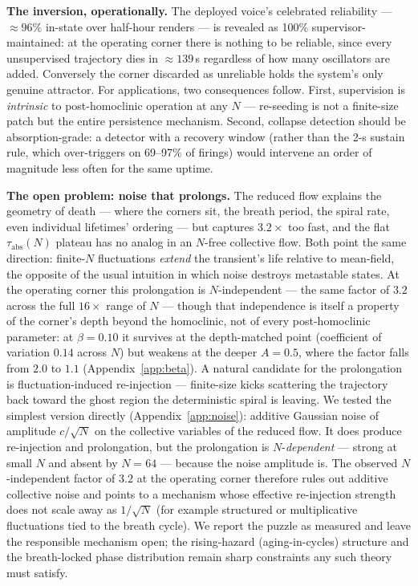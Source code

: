 \documentclass[11pt]{article}
\begin{document}
\textbf{The inversion, operationally.} The deployed voice's celebrated reliability
--- $\approx 96\%$ in-state over half-hour renders --- is revealed as 100\%
supervisor-maintained: at the operating corner there is nothing to be reliable,
since every unsupervised trajectory dies in $\approx 139$\,s regardless of how many
oscillators are added. Conversely the corner discarded as unreliable holds the
system's only genuine attractor. For applications, two consequences follow. First,
supervision is \emph{intrinsic} to post-homoclinic operation at any $N$ ---
re-seeding is not a finite-size patch but the entire persistence mechanism. Second,
collapse detection should be absorption-grade: a detector with a recovery window
(rather than the 2-s sustain rule, which over-triggers on 69--97\% of firings)
would intervene an order of magnitude less often for the same uptime.

\textbf{The open problem: noise that prolongs.} The reduced flow explains the
geometry of death --- where the corners sit, the breath period, the spiral rate,
even individual lifetimes' ordering --- but captures $3.2\times$ too fast, and the
flat $\tau_{\mathrm{abs}}(N)$ plateau has no analog in an $N$-free collective flow.
Both point the same direction: finite-$N$ fluctuations \emph{extend} the transient's
life relative to mean-field, the opposite of the usual intuition in which noise
destroys metastable states. At the operating corner this prolongation is $N$-independent --- the same factor of
$3.2$ across the full $16\times$ range of $N$ --- though that independence is itself
a property of the corner's depth beyond the homoclinic, not of every post-homoclinic
parameter: at $\beta = 0.10$ it survives at the depth-matched point (coefficient of
variation $0.14$ across $N$) but weakens at the deeper $A = 0.5$, where the factor
falls from $2.0$ to $1.1$ (Appendix~\ref{app:beta}). A natural candidate for the
prolongation is fluctuation-induced re-injection --- finite-size kicks scattering the
trajectory back toward the ghost region the deterministic spiral is leaving. We
tested the simplest version directly (Appendix~\ref{app:noise}): additive Gaussian
noise of amplitude $c/\sqrt N$ on the collective variables of the reduced flow. It
does produce re-injection and prolongation, but the prolongation is
$N$-\emph{dependent} --- strong at small $N$ and absent by $N = 64$ --- because the
noise amplitude is. The observed $N$-independent factor of $3.2$ at the operating
corner therefore rules out additive collective noise and points to a mechanism whose
effective re-injection strength does not scale away as $1/\sqrt N$ (for example
structured or multiplicative fluctuations tied to the breath cycle). We report the
puzzle as measured and leave the responsible mechanism open; the rising-hazard
(aging-in-cycles) structure and the breath-locked phase distribution remain sharp
constraints any such theory must satisfy.
\end{document}
